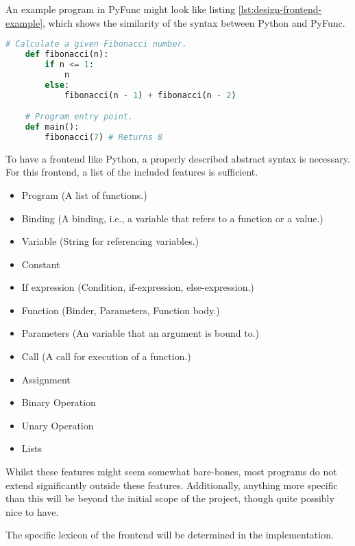 \documentclass{l4proj}
\begin{document}
An example program in PyFunc might look like listing \ref{lst:design-frontend-example}, which shows the similarity of the syntax between Python and PyFunc.
\begin{lstlisting}[language=python, caption={The simple recursive function to calculate a given fibonacci number.}, label=lst:design-frontend-example]
    # Calculate a given Fibonacci number.
    def fibonacci(n):
        if n <= 1:
            n
        else:
            fibonacci(n - 1) + fibonacci(n - 2)

    # Program entry point.
    def main():
        fibonacci(7) # Returns 8
\end{lstlisting}

To have a frontend like Python, a properly described abstract syntax is necessary.
For this frontend, a list of the included features is sufficient.
\begin{itemize}
    \item Program (A list of functions.)
    \item Binding (A binding, i.e., a variable that refers to a function or a value.)
    \item Variable (String for referencing variables.)
    \item Constant
    \item If expression (Condition, if-expression, else-expression.)
    \item Function (Binder, Parameters, Function body.)
    \item Parameters (An variable that an argument is bound to.)
    \item Call (A call for execution of a function.)
    \item Assignment
    \item Binary Operation
    \item Unary Operation
    \item Lists
\end{itemize}

Whilst these features might seem somewhat bare-bones, most programs do not extend significantly outside these features.
Additionally, anything more specific than this will be beyond the initial scope of the project, though quite possibly nice to have.

The specific lexicon of the frontend will be determined in the implementation.

\end{document}
